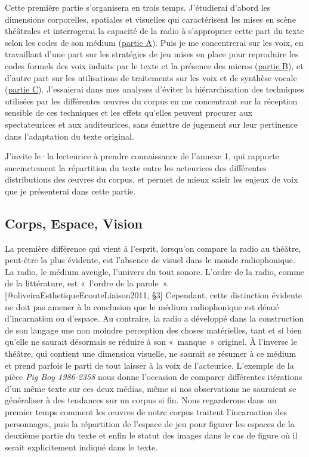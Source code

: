 \documentclass[
]{article}
\begin{document}
Cette première partie s'organisera en trois temps. J'étudierai d'abord les dimensions corporelles, spatiales et visuelles qui caractérisent les mises en scène théâtrales et interrogerai la capacité de la radio à s'approprier cette part du texte selon les codes de son médium (\hyperref[corps-espace-vision]{partie A}). Puis je me concentrerai sur les voix, en travaillant d'une part sur les stratégies de jeu mises en place pour reproduire les codes formels des voix induits par le texte et la présence des micros (\hyperref[acoustique-ou-amplifiuxe9-les-micros-et-la-voix]{partie B}), et d'autre part sur les utilisations de traitements sur les voix et de synthèse vocale (\hyperref[duxe9passer-la-voix-traitement-et-synthuxe8se]{partie C}). J'essaierai dans mes analyses d'éviter la hiérarchisation des techniques utilisées par les différentes œuvres du corpus en me concentrant sur la réception sensible de ces techniques et les effets qu'elles peuvent procurer aux spectateurices et aux auditeurices, sans émettre de jugement sur leur pertinence dans l'adaptation du texte original.

J'invite le·la lecteurice à prendre connaissance de l'annexe 1, qui rapporte succinctement la répartition du texte entre les acteurices des différentes distributions des œuvres du corpus, et permet de mieux saisir les enjeux de voix que je présenterai dans cette partie.

\subsection{Corps, Espace, Vision}\label{corps-espace-vision}

La première différence qui vient à l'esprit, lorsqu'on compare la radio au théâtre, peut-être la plus évidente, est l'absence de visuel dans le monde radiophonique. La radio, le médium aveugle, l'univers du tout sonore. L'ordre de la radio, comme de la littérature, est «~l'ordre de la parole~».{[}@oliveiraEsthetiqueEcouteLiaison2011, §3{]} Cependant, cette distinction évidente ne doit pas amener à la conclusion que le médium radiophonique est dénué d'incarnation ou d'espace. Au contraire, la radio a développé dans la construction de son langage une non moindre perception des choses matérielles, tant et si bien qu'elle ne saurait désormais se réduire à son «~manque~» originel. À l'inverse le théâtre, qui contient une dimension visuelle, ne saurait se résumer à ce médium et prend parfois le parti de tout laisser à la voix de l'acteurice. L'exemple de la pièce \emph{Pig Boy 1986-2358} nous donne l'occasion de comparer différentes itérations d'un même texte sur ces deux médias, même si nos observations ne sauraient se généraliser à des tendances sur un corpus si fin. Nous regarderons dans un premier temps comment les œuvres de notre corpus traitent l'incarnation des personnages, puis la répartition de l'espace de jeu pour figurer les espaces de la deuxième partie du texte et enfin le statut des images dans le cas de figure où il serait explicitement indiqué dans le texte.
\end{document}
